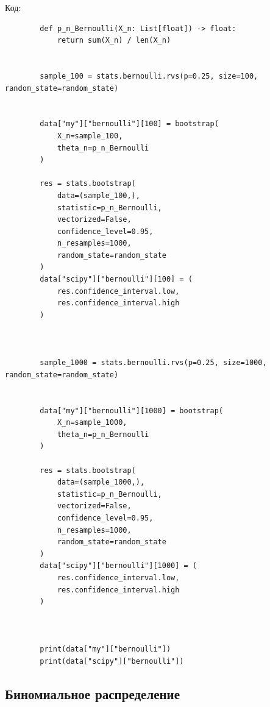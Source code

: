 \documentclass[a4paper,14pt]{extarticle}
\begin{document}
    Код:
    \begin{verbatim}
        def p_n_Bernoulli(X_n: List[float]) -> float:
            return sum(X_n) / len(X_n)


        sample_100 = stats.bernoulli.rvs(p=0.25, size=100, random_state=random_state)


        data["my"]["bernoulli"][100] = bootstrap(
            X_n=sample_100,
            theta_n=p_n_Bernoulli
        )

        res = stats.bootstrap(
            data=(sample_100,),
            statistic=p_n_Bernoulli,
            vectorized=False,
            confidence_level=0.95,
            n_resamples=1000,
            random_state=random_state
        )
        data["scipy"]["bernoulli"][100] = (
            res.confidence_interval.low,
            res.confidence_interval.high
        )



        sample_1000 = stats.bernoulli.rvs(p=0.25, size=1000, random_state=random_state)


        data["my"]["bernoulli"][1000] = bootstrap(
            X_n=sample_1000,
            theta_n=p_n_Bernoulli
        )

        res = stats.bootstrap(
            data=(sample_1000,),
            statistic=p_n_Bernoulli,
            vectorized=False,
            confidence_level=0.95,
            n_resamples=1000,
            random_state=random_state
        )
        data["scipy"]["bernoulli"][1000] = (
            res.confidence_interval.low,
            res.confidence_interval.high
        )



        print(data["my"]["bernoulli"])
        print(data["scipy"]["bernoulli"])
    \end{verbatim}

    \subsection{Биномиальное распределение}
\end{document}

